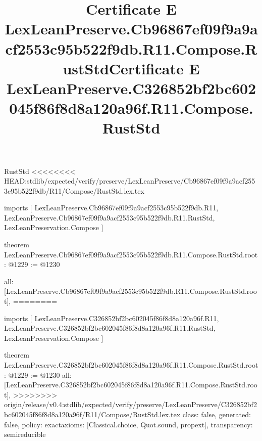 \begin{lexlean}{RustStd}
<<<<<<<< HEAD:stdlib/expected/verify/preserve/LexLeanPreserve/Cb96867ef09f9a9acf2553c95b522f9db/R11/Compose/RustStd.lex.tex
\title{Certificate E LexLeanPreserve.Cb96867ef09f9a9acf2553c95b522f9db.R11.Compose.RustStd}
\begin{coremodule}
imports [
  LexLeanPreserve.Cb96867ef09f9a9acf2553c95b522f9db.R11,
  LexLeanPreserve.Cb96867ef09f9a9acf2553c95b522f9db.R11.RustStd,
  LexLeanPreservation.Compose
]

theorem LexLeanPreserve.Cb96867ef09f9a9acf2553c95b522f9db.R11.Compose.RustStd.root : @1229 := @1230 {
  all: [LexLeanPreserve.Cb96867ef09f9a9acf2553c95b522f9db.R11.Compose.RustStd.root],
========
\title{Certificate E LexLeanPreserve.C326852bf2bc602045f86f8d8a120a96f.R11.Compose.RustStd}
\begin{coremodule}
imports [
  LexLeanPreserve.C326852bf2bc602045f86f8d8a120a96f.R11,
  LexLeanPreserve.C326852bf2bc602045f86f8d8a120a96f.R11.RustStd,
  LexLeanPreservation.Compose
]

theorem LexLeanPreserve.C326852bf2bc602045f86f8d8a120a96f.R11.Compose.RustStd.root : @1229 := @1230 {
  all: [LexLeanPreserve.C326852bf2bc602045f86f8d8a120a96f.R11.Compose.RustStd.root],
>>>>>>>> origin/release/v0.4:stdlib/expected/verify/preserve/LexLeanPreserve/C326852bf2bc602045f86f8d8a120a96f/R11/Compose/RustStd.lex.tex
  class: false,
  generated: false,
  policy: exact{axioms: [Classical.choice, Quot.sound, propext]},
  transparency: semireducible
}


\end{coremodule}}
\end{coremodule}
\end{lexlean}

